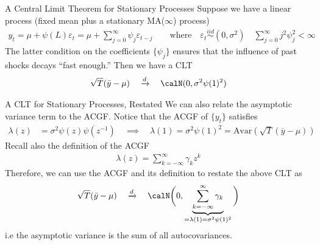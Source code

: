 \documentclass[aspectratio=169, handout]{beamer}
\newcommand{\iid}{\overset{iid}{\sim}}
\newcommand{\dto}{\xrightarrow{d}}
\begin{document}
{\footnotesize
\begin{frame}{A Central Limit Theorem for Stationary Processes}
Suppose we have a linear process (fixed mean plus a stationary
MA($\infty$) process)
\begin{align*}
  y_t
  = \mu + \psi(L)\varepsilon_t
  = \mu + \sum_{j=0}^\infty \psi_j \varepsilon_{t-j}
  \qquad\text{where}\quad
  \varepsilon_t
  \iid
  (0,\sigma^2)
  \quad
  \sum_{j=0}^\infty j^2 \psi_j^2<\infty
\end{align*}
The latter condition on the coefficients $\{\psi_j\}$ ensures that the
influence of past shocks decays ``fast enough.''
Then we have a CLT
\begin{align*}
  \sqrt{T}(\bar{y}-\mu)
  \quad\dto\quad
  \calN(0,\sigma^2\psi(1)^2)
\end{align*}
\end{frame}
}

{\footnotesize
\begin{frame}{A CLT for Stationary Processes, Restated}
We can also relate the asymptotic variance term to the ACGF.
Notice that the ACGF of $\{y_t\}$ satisfies
\begin{align*}
  \lambda(z)
  &= \sigma^2 \psi(z) \psi(z^{-1})
  \quad\implies\quad
  \lambda(1)
  =
  \sigma^2\psi(1)^2
  =
  \text{Avar}(\sqrt{T}(\overline{y}-\mu))
\end{align*}
Recall also the definition of the ACGF
\begin{align*}
  \lambda(z)
  =
  \sum_{k=-\infty}^\infty \gamma_k z^k
\end{align*}
Therefore, we can use the ACGF and its definition to restate the above
CLT as
\begin{align*}
  \sqrt{T}(\bar{y}-\mu)
  \quad\dto\quad
  \calN\bigg(
    0,
    \underbrace{%
    \sum_{k=-\infty}^\infty \gamma_k
    }_{=\lambda(1)=\sigma^2\psi(1)^2}
  \bigg)
\end{align*}
i.e the asymptotic variance is the sum of all autocovariances.
\end{frame}
}
\end{document}
